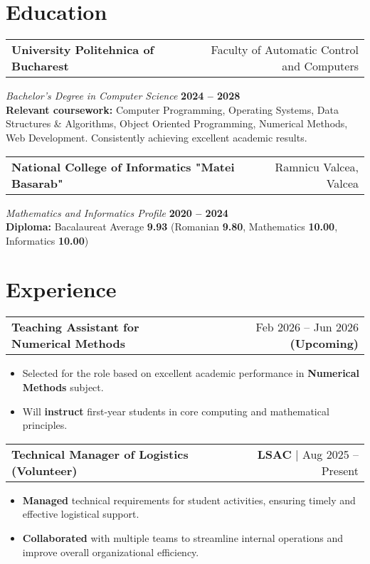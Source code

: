\documentclass[a4paper,12pt]{article}
\makeatletter
\newenvironment{jobshort}[2]
    {
    \begin{tabularx}{\linewidth}{@{}l X r@{}}
    \textbf{#1} & \hfill &  #2 \\[3.75pt]
    \end{tabularx}
    }
    {
    }
\newenvironment{joblong}[2]
    {
    \begin{tabularx}{\linewidth}{@{}l X r@{}}
    \textbf{#1} & \hfill &  #2 \\[3.75pt]
    \end{tabularx}
    \begin{minipage}[t]{\linewidth}
    \begin{itemize}[nosep,after=\strut, leftmargin=1em, itemsep=3pt,label=--]
    }
    {
    \end{itemize}
    \end{minipage}    
    }
\makeatother
\begin{document}
\section{Education}
\begin{jobshort}{\textbf{University Politehnica of Bucharest}}{Faculty of Automatic Control and Computers}
\textit{Bachelor's Degree in Computer Science} \hfill\textbf{2024 – 2028} \\
\normalsize{\textbf{Relevant coursework:} Computer Programming, Operating Systems, Data Structures \& Algorithms, Object Oriented Programming, Numerical Methods, Web Development. Consistently achieving excellent academic results.}
\end{jobshort}

\begin{jobshort}{\textbf{National College of Informatics "Matei Basarab"}}{Ramnicu Valcea, Valcea}
\textit{Mathematics and Informatics Profile} \hfill \textbf{2020 – 2024} \\
\textbf{Diploma:} Bacalaureat Average \textbf{9.93} (Romanian \textbf{9.80}, Mathematics \textbf{10.00}, Informatics \textbf{10.00})
\end{jobshort}

\section{Experience}

\begin{joblong}{\textbf{Teaching Assistant} for Numerical Methods}{Feb 2026 – Jun 2026 \textbf{(Upcoming)}}
\item Selected for the role based on excellent academic performance in \textbf{Numerical Methods} subject.
\item Will \textbf{instruct} first-year students in core computing and mathematical principles.
\end{joblong}

\begin{joblong}{\textbf{Technical Manager of Logistics} (Volunteer)}{\textbf{LSAC} | Aug 2025 – Present}
\item \textbf{Managed} technical requirements for student activities, ensuring timely and effective logistical support.
\item \textbf{Collaborated} with multiple teams to streamline internal operations and improve overall organizational efficiency.
\end{joblong}
\end{document}
